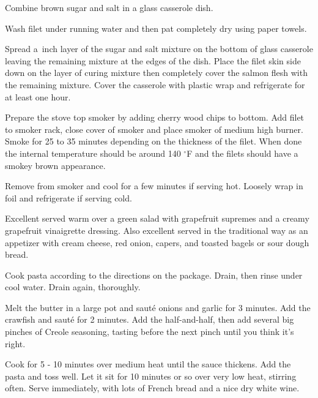 \documentclass[letterpaper]{recipePMG}
\renewcommand{\deg}{$^\circ$}
\newcommand{\quarter}{\nicefrac{1}{4} \,}
\begin{document}
Combine brown sugar and salt in a glass casserole dish.  

Wash filet under running water and then pat completely dry using paper towels.

Spread a \quarter inch layer of the sugar and salt mixture on the bottom of glass casserole leaving the remaining mixture at the edges of the dish. Place the filet skin side down on the layer of curing mixture then completely cover the salmon flesh with the remaining mixture.  Cover the casserole with plastic wrap and refrigerate for at least one hour. 

Prepare the stove top smoker by adding cherry wood chips to bottom. Add filet to smoker rack, close cover of smoker and place smoker of medium high burner.  Smoke for 25 to 35 minutes depending on the thickness of the filet. When done the internal temperature should be around 140 \deg F and the filets should have a smokey brown appearance. 

Remove from smoker and cool for a few minutes if serving hot. Loosely wrap in foil and refrigerate if serving cold.

Excellent served warm over a green salad with grapefruit supremes and a creamy grapefruit vinaigrette dressing. Also excellent served in the traditional way as an appetizer with cream cheese, red onion, capers, and toasted bagels or sour dough bread.

\newpage
{}


Cook pasta according to the directions on the package.  Drain,
then rinse under cool water.  Drain again, thoroughly.

Melt the butter in a large pot and saut\'{e} onions and garlic for 3
minutes.  Add the crawfish and saut\'{e} for 2 minutes.  Add the
half-and-half, then add several big pinches of Creole seasoning,
tasting before the next pinch until you think it's right.

Cook for 5 - 10 minutes over medium heat until the sauce thickens.
Add the pasta and toss well.  Let it sit for 10 minutes or so
over very low heat, stirring often.  Serve immediately, with lots
of French bread and a nice dry white wine.


\newpage
\end{document}
